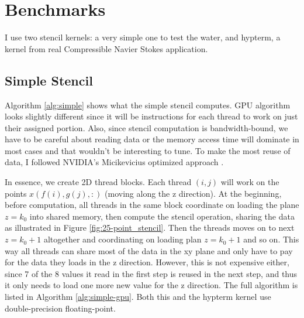 \section{Benchmarks}
I use two stencil kernels: a very simple one to test the water, and hypterm, a kernel from real Compressible Navier Stokes application.

\subsection{Simple Stencil}
Algorithm \ref{alg:simple} shows what the simple stencil computes. GPU algorithm looks slightly different since it will be instructions for each thread to work on just their assigned portion. Also, since stencil computation is bandwidth-bound, we have to be careful about reading data or the memory access time will dominate in most cases and that wouldn't be interesting to tune.
To make the most reuse of data, I followed NVIDIA's Micikevicius optimized approach \cite{nvidia_25p-stencil}.

In essence, we create 2D thread blocks. Each thread $(i,j)$ will work on the points $x(f(i),g(j),:)$ (moving along the z direction). At the beginning, before computation, all threads in the same block coordinate on loading the plane $z=k_0$ into shared memory, then compute the stencil operation, sharing the data as illustrated in Figure \ref{fig:25-point_stencil}. Then the threads moves on to next $z=k_0+1$ altogether and coordinating on loading plan $z=k_0+1$ and so on. This way all threads can share most of the data in the xy plane and only have to pay for the data they loads in the z direction. However, this is not expensive either, since 7 of the 8 values it read in the first step is reused in the next step, and thus it only needs to load one more new value for the z direction. The full algorithm is listed in Algorithm \ref{alg:simple-gpu}. Both this and the hypterm kernel use double-precision floating-point.

